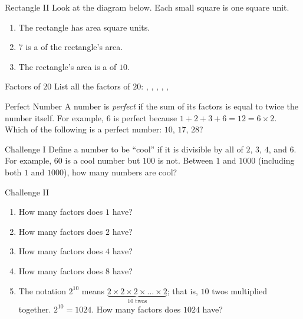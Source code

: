 \documentclass[12pt,letterpaper]{article}
\begin{document}
\begin{problem}{Rectangle II}
 Look at the diagram below. Each small square is one square unit.

 \begin{center}
 \end{center}

 \begin{enumerate}
  \item The rectangle has area \blankD square units.
  \item \(7\) is a \underline{\hspace{10em}} of the rectangle's area.
  \item The rectangle's area is a \underline{\hspace{10em}} of \(10\).
 \end{enumerate}
\end{problem}

\begin{problem}{Factors of \(20\)}
 List all the factors of \(20\):
 \blankB, \blankB,
 \blankB, \blankB,
 \blankB, \blankB
\end{problem}

\begin{problem}{Perfect Number}
  A number is \emph{perfect} if the sum of its factors is equal to twice the
  number itself. For example, \(6\) is perfect because \(1+2+3+6=12=6\times2\).
  Which of the following is a perfect number: \(10\), \(17\), \(28\)?
\end{problem}

\begin{problem}{Challenge I}
 Define a number to be ``cool'' if it is divisible by all of \(2\), \(3\),
 \(4\), and \(6\). For example, \(60\) is a cool number but \(100\) is not.
 Between \(1\) and \(1000\) (including both \(1\) and \(1000\)), how many
 numbers are cool? 
\end{problem}

\begin{problem}{Challenge II}
 \begin{enumerate}
  \item How many factors does \(1\) have?
  \item How many factors does \(2\) have?
  \item How many factors does \(4\) have?
  \item How many factors does \(8\) have?
  \item The notation \(2^{10}\) means \(\underbrace{ 2\times2\times2\times
  \ldots\times2}_{10\text{ twos}}\); that is, \(10\) twos multiplied together.
  \(2^{10}=1024\). How many factors does \(1024\) have?
 \end{enumerate}
\end{problem}
\end{document}
